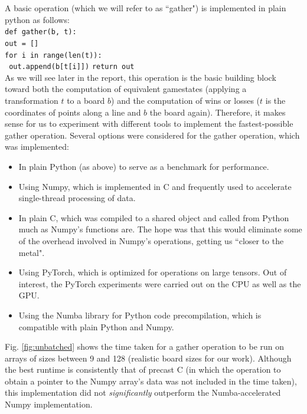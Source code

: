 \documentclass[english, 11pt]{article}
\begin{document}
A basic operation (which we will refer to as ``gather") is implemented in plain python as follows:\\
\texttt{def gather(b, t):}\\
\indent \texttt{out = []}\\
\indent \texttt{for i in range(len(t)):}\\
\indent \indent \texttt{   out.append(b[t[i]])}
\indent \texttt{return out}\\

As we will see later in the report, this operation is the basic building block toward both the computation of equivalent gamestates (applying a transformation $t$ to a board $b$) and the computation of wins or losses ($t$ is the coordinates of points along a line and $b$ the board again). Therefore, it makes sense for us to experiment with different tools to implement the fastest-possible gather operation.
Several options were considered for the gather operation, which was implemented:
\begin{itemize}
\item In plain Python (as above) to serve as a benchmark for performance.
\item Using Numpy, which is implemented in C and frequently used to accelerate single-thread processing of data.
\item In plain C, which was compiled to a shared object and called from Python much as Numpy's functions are. The hope was that this would eliminate some of the overhead involved in Numpy's operations, getting us ``closer to the metal". 
\item Using PyTorch, which is optimized for operations on large tensors. Out of interest, the PyTorch experiments were carried out on the CPU as well as the GPU.
\item Using the Numba library for Python code precompilation, which is compatible with plain Python and Numpy. 
\end{itemize}
Fig. \ref{fig:unbatched} shows the time taken for a gather operation to be run on arrays of sizes between 9 and 128 (realistic board sizes for our work).
Although the best runtime is consistently that of precast C (in which the operation to obtain a pointer to the Numpy array's data was not included in the time taken), this implementation did not \textit{significantly} outperform the Numba-accelerated Numpy implementation. 
\end{document}
